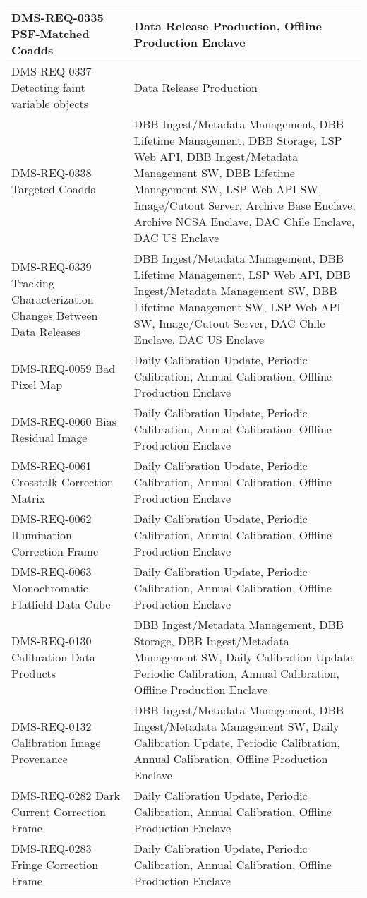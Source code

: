 \begin{longtable}{p{}p{}}
DMS-REQ-0335 PSF-Matched Coadds & Data Release Production, Offline Production Enclave \\ \hline
DMS-REQ-0337 Detecting faint variable objects & Data Release Production \\ \hline
DMS-REQ-0338 Targeted Coadds & DBB Ingest/Metadata Management, DBB Lifetime Management, DBB Storage, LSP Web API, DBB Ingest/Metadata Management SW, DBB Lifetime Management SW, LSP Web API SW, Image/Cutout Server, Archive Base Enclave, Archive NCSA Enclave, DAC Chile Enclave, DAC US Enclave \\ \hline
DMS-REQ-0339 Tracking Characterization Changes Between Data Releases & DBB Ingest/Metadata Management, DBB Lifetime Management, LSP Web API, DBB Ingest/Metadata Management SW, DBB Lifetime Management SW, LSP Web API SW, Image/Cutout Server, DAC Chile Enclave, DAC US Enclave \\ \hline
DMS-REQ-0059 Bad Pixel Map & Daily Calibration Update, Periodic Calibration, Annual Calibration, Offline Production Enclave \\ \hline
DMS-REQ-0060 Bias Residual Image & Daily Calibration Update, Periodic Calibration, Annual Calibration, Offline Production Enclave \\ \hline
DMS-REQ-0061 Crosstalk Correction Matrix & Daily Calibration Update, Periodic Calibration, Annual Calibration, Offline Production Enclave \\ \hline
DMS-REQ-0062 Illumination Correction Frame & Daily Calibration Update, Periodic Calibration, Annual Calibration, Offline Production Enclave \\ \hline
DMS-REQ-0063 Monochromatic Flatfield Data Cube & Daily Calibration Update, Periodic Calibration, Annual Calibration, Offline Production Enclave \\ \hline
DMS-REQ-0130 Calibration Data Products & DBB Ingest/Metadata Management, DBB Storage, DBB Ingest/Metadata Management SW, Daily Calibration Update, Periodic Calibration, Annual Calibration, Offline Production Enclave \\ \hline
DMS-REQ-0132 Calibration Image Provenance & DBB Ingest/Metadata Management, DBB Ingest/Metadata Management SW, Daily Calibration Update, Periodic Calibration, Annual Calibration, Offline Production Enclave \\ \hline
DMS-REQ-0282 Dark Current Correction Frame & Daily Calibration Update, Periodic Calibration, Annual Calibration, Offline Production Enclave \\ \hline
DMS-REQ-0283 Fringe Correction Frame & Daily Calibration Update, Periodic Calibration, Annual Calibration, Offline Production Enclave \\ \hline

\end{longtable}
